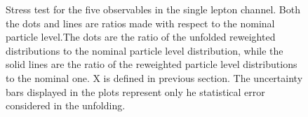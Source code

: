 \begin{figure}[ht]
  \caption{Stress test for the five observables in the single lepton channel. Both the dots and lines are ratios made with respect to the nominal particle level.The dots are the ratio of the unfolded reweighted distributions to the nominal particle level distribution, while the solid lines are the ratio of the reweighted particle level distributions to the nominal one. X is defined in previous section. The uncertainty bars displayed in the plots represent only he statistical error considered in the unfolding.}
  \label{fig:unfolded_ljet_dist_stress_test}
\end{figure}
\FloatBarrier


